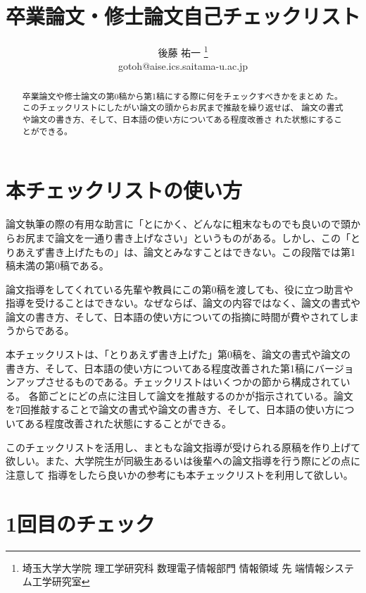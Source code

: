 \documentclass[11pt,a4j]{jsarticle}
\begin{document}
\title{卒業論文・修士論文自己チェックリスト}
\author{後藤 祐一 \thanks{埼玉大学大学院 理工学研究科 数理電子情報部門 情報領域 先
端情報システム工学研究室}\\ gotoh@aise.ics.saitama-u.ac.jp}
\maketitle

\begin{abstract}
 卒業論文や修士論文の第0稿から第1稿にする際に何をチェックすべきかをまとめ
 た。このチェックリストにしたがい論文の頭からお尻まで推敲を繰り返せば、
 論文の書式や論文の書き方、そして、日本語の使い方についてある程度改善さ
 れた状態にすることができる。
\end{abstract}

\setcounter{section}{-1}

\section{本チェックリストの使い方}

論文執筆の際の有用な助言に「とにかく、どんなに粗末なものでも良いので頭からお尻まで論文を一通り書き上げなさい」というものがある。しかし、この「とりあえず書き上げたもの」は、論文とみなすことはできない。この段階では第1稿未満の第0稿である。

論文指導をしてくれている先輩や教員にこの第0稿を渡しても、役に立つ助言や指導を受けることはできない。なぜならば、論文の内容ではなく、論文の書式や論文の書き方、そして、日本語の使い方についての指摘に時間が費やされてしまうからである。

本チェックリストは、「とりあえず書き上げた」第0稿を、論文の書式や論文の
書き方、そして、日本語の使い方についてある程度改善された第1稿にバージョ
ンアップさせるものである。チェックリストはいくつかの節から構成されている。
各節ごとにどの点に注目して論文を推敲するのかが指示されている。論文を7回推敲することで論文の書式や論文の書き方、そして、日本語の使い方についてある程度改善された状態にすることができる。

このチェックリストを活用し、まともな論文指導が受けられる原稿を作り上げて
欲しい。また、大学院生が同級生あるいは後輩への論文指導を行う際にどの点に注意して
指導をしたら良いかの参考にも本チェックリストを利用して欲しい。

\section{1回目のチェック}
\end{document}
